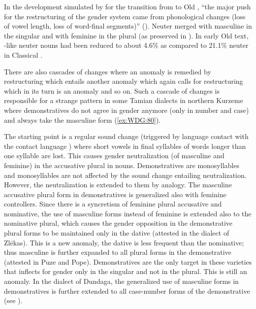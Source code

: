 \documentclass[output=collectionpaper]{langsci/langscibook}
\begin{document}
In the development simulated by \cite{Polinsky2003} for the transition from  to Old , ``the major push for the restructuring of the gender system came from phonological changes (loss of vowel length, loss of word-final segments)'' (\citealt[385]{Polinsky2003}). Neuter merged with masculine in the singular and with feminine in the plural (as preserved in ). In early Old  text, -like neuter nouns had been reduced to about 4.6\% as compared to 21.1\% neuter in Classical .

There are also cascades of changes where an anomaly is remedied by restructuring which entails another anomaly which again calls for restructuring which in its turn is an anomaly and so on. Such a cascade of changes is responsible for a strange pattern in some Tamian  dialects in northern Kurzeme where demonstratives do not agree in gender anymore (only in number and case) and always take the masculine form (\ref{ex:WDG:80}).


The starting point is a regular sound change (triggered by language contact with the  contact language ) where short vowels in final syllables of words longer than one syllable are lost. This causes gender neutralization (of masculine and feminine) in the accusative plural in nouns. Demonstratives are monosyllables and monosyllables are not affected by the sound change entailing neutralization. However, the neutralization is extended to them by analogy. The masculine accusative plural form in demonstratives is generalized also with feminine controllers. Since there is a syncretism of feminine plural accusative and nominative, the use of masculine forms instead of feminine is extended also to the nominative plural, which causes the gender opposition in the demonstrative plural forms to be maintained only in the dative (attested in the dialect of Zlēkas). This is a new anomaly, the dative is less frequent than the nominative; thus masculine is further expanded to all plural forms in the demonstrative (attested in Puze and Pope). Demonstratives are the only target in these varieties that inflects for gender only in the singular and not in the plural. This is still an anomaly. In the dialect of Dundaga, the generalized use of masculine forms in demonstratives is further extended to all case-number forms of the demonstrative (see \citealt{Waelchli2017}).
\end{document}

